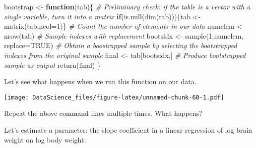 \documentclass[
]{book}
\newenvironment{Shaded}{\begin{snugshade}}{\end{snugshade}}
\newcommand{\AttributeTok}[1]{\textcolor[rgb]{0.77,0.63,0.00}{#1}}
\newcommand{\CommentTok}[1]{\textcolor[rgb]{0.56,0.35,0.01}{\textit{#1}}}
\newcommand{\ConstantTok}[1]{\textcolor[rgb]{0.00,0.00,0.00}{#1}}
\newcommand{\ControlFlowTok}[1]{\textcolor[rgb]{0.13,0.29,0.53}{\textbf{#1}}}
\newcommand{\DecValTok}[1]{\textcolor[rgb]{0.00,0.00,0.81}{#1}}
\newcommand{\FunctionTok}[1]{\textcolor[rgb]{0.00,0.00,0.00}{#1}}
\newcommand{\NormalTok}[1]{#1}
\newcommand{\OtherTok}[1]{\textcolor[rgb]{0.56,0.35,0.01}{#1}}
\newcommand{\SpecialCharTok}[1]{\textcolor[rgb]{0.00,0.00,0.00}{#1}}
\begin{document}
\begin{Shaded}
\begin{Highlighting}[]
\NormalTok{bootstrap }\OtherTok{\textless{}{-}} \ControlFlowTok{function}\NormalTok{(tab)\{}
  \CommentTok{\# Preliminary check: if the table is a vector with a single variable, turn it into a matrix}
  \ControlFlowTok{if}\NormalTok{(}\FunctionTok{is.null}\NormalTok{(}\FunctionTok{dim}\NormalTok{(tab)))\{tab }\OtherTok{\textless{}{-}} \FunctionTok{matrix}\NormalTok{(tab,}\AttributeTok{ncol=}\DecValTok{1}\NormalTok{)\}}
  \CommentTok{\# Count the number of elements in our data}
\NormalTok{  numelem }\OtherTok{\textless{}{-}} \FunctionTok{nrow}\NormalTok{(tab)}
  \CommentTok{\# Sample indexes with replacement}
\NormalTok{  bootsidx }\OtherTok{\textless{}{-}} \FunctionTok{sample}\NormalTok{(}\DecValTok{1}\SpecialCharTok{:}\NormalTok{numelem, }\AttributeTok{replace=}\ConstantTok{TRUE}\NormalTok{)}
  \CommentTok{\# Obtain a boostrapped sample by selecting the bootstrapped indexes from the original sample}
\NormalTok{  final }\OtherTok{\textless{}{-}}\NormalTok{ tab[bootsidx,]}
  \CommentTok{\# Produce bootstrapped sample as output}
  \FunctionTok{return}\NormalTok{(final)}
\NormalTok{\}}
\end{Highlighting}
\end{Shaded}

Let's see what happens when we run this function on our data.

\begin{Shaded}
\end{Shaded}

\texttt{[image: DataScience\_files/figure-latex/unnamed-chunk-60-1.pdf]}

Repeat the above command lines multiple times. What happens?

Let's estimate a parameter: the slope coefficient in a linear regression of log brain weight on log body weight:

\begin{Shaded}
\end{Shaded}
\end{document}
